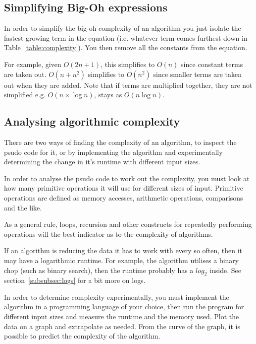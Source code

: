 \subsection{Simplifying Big-Oh expressions}

In order to simplify the big-oh complexity of an algorithm you just isolate the
fastest growing term in the equation (i.e. whatever term comes furthest down in
Table~\ref{table:complexity}). You then remove all the constants from the
equation.

For example, given $O(2n + 1)$, this simplifies to $O(n)$ since constant terms
are taken out. $O(n + n^2)$ simplifies to $O(n^2)$ since smaller terms are taken
out when they are added. Note that if terms are multiplied together, they are not
simplified e.g. $O(n \times \log n)$, stays as $O(n\log n)$.

\subsection{Analysing algorithmic complexity}

There are two ways of finding the complexity of an algorithm, to inspect the
psudo code for it, or by implementing the algorithm and experimentally
determining the change in it's runtime with different input sizes.


In order to analyse the psudo code to work out the complexity, you must look at
how many primitive operations it will use for different sizes of input.
Primitive operations are defined as memory accesses, arithmetic operations,
comparisons and the like.

As a general rule, loops, recursion and other constructs for repeatedly
performing operations will the best indicator as to the complexity of
algorithms.

If an algorithm is reducing the data it has to work with every so often, then it
may have a logarithmic runtime. For example, the algorithm utilises a binary
chop (such as binary search), then the runtime probably has a $log_2$ inside.
See section~\ref{subsubsec:logs} for a bit more on logs.

In order to determine complexity experimentally, you must implement the
algorithm in a programming language of your choice, then run the program for
different input sizes and measure the runtime and the memory used. Plot the data
on a graph and extrapolate as needed. From the curve of the graph, it is
possible to predict the complexity of the algorithm.

